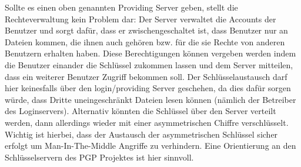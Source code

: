 \documentclass[13pt,a4paper,bibliography=totocnumbered,listof=totocnumbered]{scrartcl}
\begin{document}
Sollte es einen oben genannten Providing Server geben, stellt die Rechteverwaltung kein Problem dar: Der Server verwaltet die Accounts der Benutzer und sorgt dafür, dass er zwischengeschaltet ist, dass Benutzer nur an Dateien kommen, die ihnen auch gehören bzw. für die sie Rechte von anderen Benutzern erhalten haben. Diese Berechtigungen können vergeben werden indem die Benutzer einander die Schlüssel zukommen lassen und dem Server mitteilen, dass ein weiterer Benutzer Zugriff bekommen soll. Der Schlüsselaustausch darf hier keinesfalls über den login/providing Server geschehen, da dies dafür sorgen würde, dass Dritte uneingeschränkt Dateien lesen können (nämlich der Betreiber des Loginservers). Alternativ könnten die Schlüssel über den Server verteilt werden, dann allerdings wieder mit einer asymmetrischen Chiffre verschlüsselt. Wichtig ist hierbei, dass der Austausch der asymmetrischen Schlüssel sicher erfolgt um Man-In-The-Middle Angriffe zu verhindern. Eine Orientierung an den Schlüsselservern des PGP Projektes ist hier sinnvoll.
\end{document}
